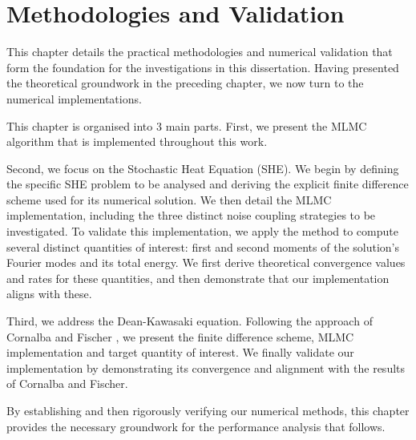 \chapter{Methodologies and Validation}\label{chap:method_and_validation}

This chapter details the practical methodologies and numerical validation 
that form the foundation for the investigations in this dissertation. Having 
presented the theoretical groundwork in the preceding chapter, we now 
turn to the numerical implementations.

This chapter is organised into 3 main parts. First, 
we present the MLMC algorithm that is implemented throughout this work.


Second, we focus on the Stochastic Heat Equation (SHE). We begin
by defining the specific SHE problem to be analysed and 
deriving the explicit finite difference scheme 
used for its numerical solution. We then 
detail the MLMC implementation,
including the three distinct noise coupling strategies to be investigated. 
To validate this implementation, we apply the method to compute several 
distinct quantities of interest: first and second moments of the solution's
Fourier modes and its total energy. We first derive 
theoretical convergence values and rates for these quantities, and then demonstrate that
our implementation aligns with these.

Third, we address the Dean-Kawasaki equation. Following 
the approach of Cornalba and Fischer \cite{cornalba2025multilevel}, 
we present the finite difference scheme, MLMC implementation and target 
quantity of interest. 
We finally validate our implementation
by demonstrating its convergence and alignment with the results of Cornalba and Fischer.

By establishing and then rigorously verifying our numerical methods, this chapter 
provides the necessary groundwork for the performance analysis that follows. 





